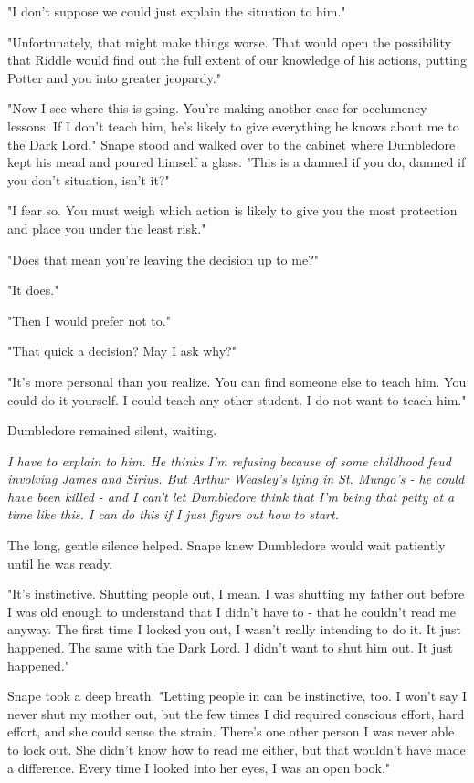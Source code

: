 "I don't suppose we could just explain the situation to him."

"Unfortunately, that might make things worse. That would open the possibility that Riddle would find out the full extent of our knowledge of his actions, putting Potter and you into greater jeopardy."

"Now I see where this is going. You're making another case for occlumency lessons. If I don't teach him, he's likely to give everything he knows about me to the Dark Lord." Snape stood and walked over to the cabinet where Dumbledore kept his mead and poured himself a glass. "This is a damned if you do, damned if you don't situation, isn't it?"

"I fear so. You must weigh which action is likely to give you the most protection and place you under the least risk."

"Does that mean you're leaving the decision up to me?"

"It does."

"Then I would prefer not to."

"That quick a decision? May I ask why?"

"It's more personal than you realize. You can find someone else to teach him. You could do it yourself. I could teach any other student. I do not want to teach him."

Dumbledore remained silent, waiting.

\emph{I have to explain to him. He thinks I'm refusing because of some childhood feud involving James and Sirius. But Arthur Weasley's lying in St. Mungo's - he could have been killed - and I can't let Dumbledore think that I'm being that petty at a time like this. I can do this if I just figure out how to start.}

The long, gentle silence helped. Snape knew Dumbledore would wait patiently until he was ready.

"It's instinctive. Shutting people out, I mean. I was shutting my father out before I was old enough to understand that I didn't have to - that he couldn't read me anyway. The first time I locked you out, I wasn't really intending to do it. It just happened. The same with the Dark Lord. I didn't want to shut him out. It just happened."

Snape took a deep breath. "Letting people in can be instinctive, too. I won't say I never shut my mother out, but the few times I did required conscious effort, hard effort, and she could sense the strain. There's one other person I was never able to lock out. She didn't know how to read me either, but that wouldn't have made a difference. Every time I looked into her eyes, I was an open book."

